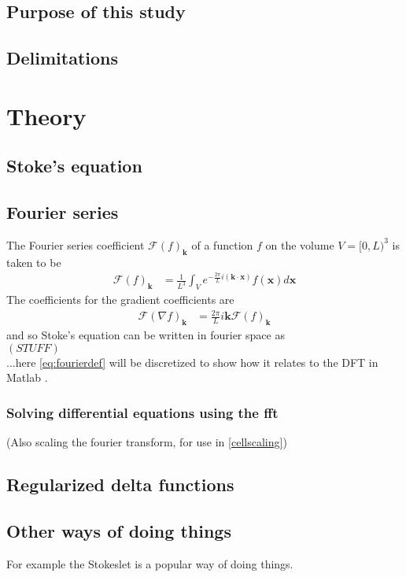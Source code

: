 \documentclass[a4paper,twoside=false,abstract=false,numbers=noenddot,
titlepage=false,headings=small,parskip=half,version=last]{scrartcl}
\begin{document}
\subsection{Purpose of this study}
\subsection{Delimitations}

\section{Theory}
\subsection{Stoke's equation}
\subsection{Fourier series}
The Fourier series coefficient $\mathcal{F}(f)_{\mathbf{k}}$ of a function $f$ on the volume $V=[0,L)^3$ is taken to be
\begin{align}
\mathcal{F}(f)_{\mathbf{k}} &= \frac{1}{L^3} \int_V e^{-\frac{2\pi}{L}i(\mathbf{k}\cdot \mathbf{x})}f(\mathbf{x})d\mathbf{x}
    \label{eq:fourierdef}
\end{align}
The coefficients for the gradient coefficients are
\begin{align}
\mathcal{F}(\nabla f)_{\mathbf{k}} &= \frac{2\pi}{L}i\mathbf{k} \mathcal{F}(f)_{\mathbf{k}}
\end{align}
and so Stoke's equation can be written in fourier space as \\
$\left(STUFF\right)$\\
...here \eqref{eq:fourierdef} will be discretized to show how it relates to the DFT in Matlab \cite{matlabdft}.

\subsubsection{Solving differential equations using the fft}
(Also scaling the fourier transform, for use in \ref{cellscaling})
\subsection{Regularized delta functions}
\subsection{Other ways of doing things}
For example the Stokeslet is a popular way of doing things.
\end{document}
